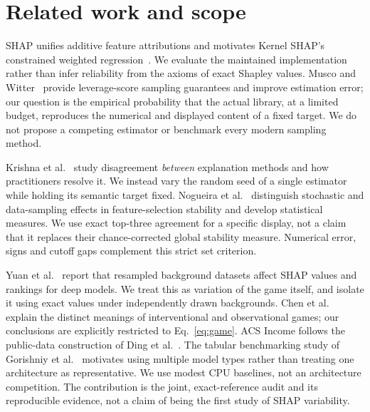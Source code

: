 \documentclass{article}
\begin{document}
\section{Related work and scope}
SHAP unifies additive feature attributions and motivates Kernel SHAP's constrained weighted regression~\citep{lundberg2017}. We evaluate the maintained implementation rather than infer reliability from the axioms of exact Shapley values. Musco and Witter~\citep{musco2025} provide leverage-score sampling guarantees and improve estimation error; our question is the empirical probability that the actual library, at a limited budget, reproduces the numerical and displayed content of a fixed target. We do not propose a competing estimator or benchmark every modern sampling method.

Krishna et al.~\citep{krishna2024} study disagreement \emph{between} explanation methods and how practitioners resolve it. We instead vary the random seed of a single estimator while holding its semantic target fixed. Nogueira et al.~\citep{nogueira2018} distinguish stochastic and data-sampling effects in feature-selection stability and develop statistical measures. We use exact top-three agreement for a specific display, not a claim that it replaces their chance-corrected global stability measure. Numerical error, signs and cutoff gaps complement this strict set criterion.

Yuan et al.~\citep{yuan2023} report that resampled background datasets affect SHAP values and rankings for deep models. We treat this as variation of the game itself, and isolate it using exact values under independently drawn backgrounds. Chen et al.~\citep{chen2020} explain the distinct meanings of interventional and observational games; our conclusions are explicitly restricted to Eq.~\eqref{eq:game}. ACS Income follows the public-data construction of Ding et al.~\citep{ding2021}. The tabular benchmarking study of Gorishniy et al.~\citep{gorishniy2021} motivates using multiple model types rather than treating one architecture as representative. We use modest CPU baselines, not an architecture competition. The contribution is the joint, exact-reference audit and its reproducible evidence, not a claim of being the first study of SHAP variability.




\end{document}
